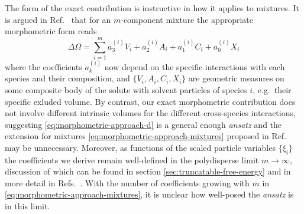 \documentclass[11pt,twoside]{report}
\def\includebibliography{}
\begin{document}
The form of the exact contribution is instructive in how it applies to mixtures.
It is argued in Ref.\ \cite{KodamaJCP2011} that for an $m$-component mixture the appropriate morphometric form reads
\begin{equation}\label{eq:morphometric-approach-mixtures}
  \Delta \Omega
  =
  \sum_{i=1}^m
  a_3^{(i)} V_i
  + a_2^{(i)} A_i
  + a_1^{(i)} C_i
  + a_0^{(i)} X_i
\end{equation}
where the coefficients $a_k^{(i)}$ now depend on the specific interactions with each species and their composition, and $\{V_i, A_i, C_i, X_i\}$ are geometric measures on some composite body of the solute with solvent particles of species $i$, e.g.\ their specific exluded volume.
By contrast, our exact morphometric contribution does not involve different intrinsic volumes for the different cross-species interactions, suggesting \eqref{eq:morphometric-approach-d} is a general enough \emph{ansatz} and the extension for mixtures \eqref{eq:morphometric-approach-mixtures} proposed in Ref.\ \cite{KodamaJCP2011} may be unnecessary.
Moreover, as functions of the scaled particle variables $\{\xi_i\}$ the coefficients we derive remain well-defined in the polydisperse limit $m \to \infty$, discussion of which can be found in section \ref{sec:truncatable-free-energy} and in more detail in Refs.\ \cite{GualtieriJCP1982,WarrenPRL1998,SollichPRL1998,SollichAiCP2001}.
With the number of coefficients growing with $m$ in \eqref{eq:morphometric-approach-mixtures}, it is unclear how well-posed the \emph{ansatz} is in this limit.

\ifdefined\includebibliography
  \printbibliography
\fi
\end{document}
